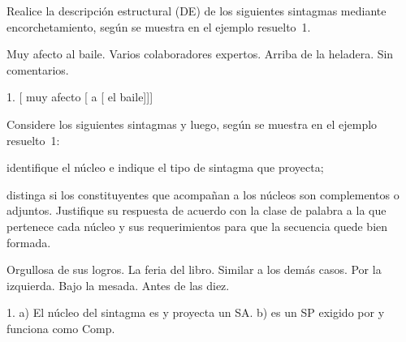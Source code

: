 \begin{ejercicio}\label{ej:05-de}
Realice la descripción estructural (DE) de los siguientes sintagmas mediante
encorchetamiento, según se muestra en el ejemplo resuelto~1.

\begin{exe}
  \ex Muy afecto al baile.
  \ex Varios colaboradores expertos.
  \ex Arriba de la heladera.
  \ex Sin comentarios.
\end{exe}

\begin{resuelto}
1. [ muy afecto [ a
[ el baile]]]
\end{resuelto}
\end{ejercicio}

\begin{ejercicio}\label{ej:05-comp-adj}
Considere los siguientes sintagmas y luego, según se muestra en el ejemplo
resuelto~1:

\begin{consignas}
  \item identifique el núcleo e indique el tipo de sintagma que proyecta;
  \item distinga si los constituyentes que acompañan a los núcleos son
        complementos o adjuntos. Justifique su respuesta de acuerdo con la clase
        de palabra a la que pertenece cada núcleo y sus requerimientos para que
        la secuencia quede bien formada.
\end{consignas}

\begin{exe}
  \ex Orgullosa de sus logros.
  \ex La feria del libro.
  \ex Similar a los demás casos.
  \ex Por la izquierda.
  \ex Bajo la mesada.
  \ex Antes de las diez.
\end{exe}

\begin{resuelto}
1. a) El núcleo del sintagma es  y proyecta un SA. b)  es un SP exigido por  y funciona como Comp.
\end{resuelto}
\end{ejercicio}

